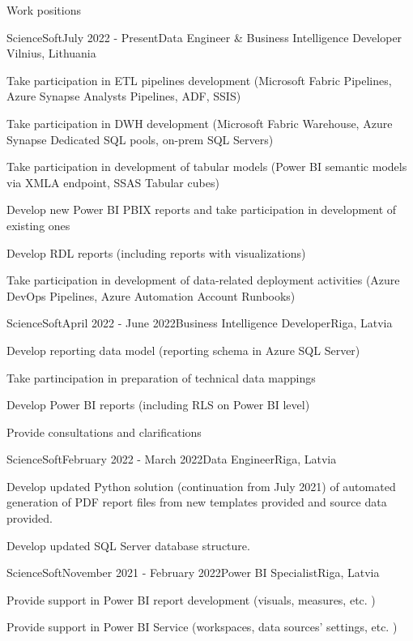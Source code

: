 \documentclass{resume} %
\begin{document}
\begin{rSection}{Work positions}

\begin{rSubsection}{ScienceSoft}{July 2022 - Present}{Data Engineer \& Business Intelligence Developer
}{Vilnius, Lithuania}
\item Take participation in ETL pipelines development (Microsoft Fabric Pipelines, Azure Synapse Analysts Pipelines, ADF, SSIS)
\item Take participation in DWH development (Microsoft Fabric Warehouse, Azure Synapse Dedicated SQL pools, on-prem SQL Servers)
\item Take participation in development of tabular models (Power BI semantic models via XMLA endpoint, SSAS Tabular cubes)
\item Develop new Power BI PBIX reports and take participation in development of existing ones
\item Develop RDL reports (including reports with visualizations)
\item Take participation in development of data-related deployment activities (Azure DevOps Pipelines, Azure Automation Account Runbooks)
\end{rSubsection}

\begin{rSubsection}{ScienceSoft}{April 2022 - June 2022}{Business Intelligence Developer}{Riga, Latvia}
\item Develop reporting data model (reporting schema in Azure SQL Server)
\item Take partincipation in preparation of technical data mappings
\item Develop Power BI reports (including RLS on Power BI level)
\item Provide consultations and clarifications
\end{rSubsection}

\begin{rSubsection}{ScienceSoft}{February 2022 - March 2022}{Data Engineer}{Riga, Latvia}
\item Develop updated Python solution (continuation from July 2021) of automated generation of PDF report files from new templates provided and source data provided.
\item Develop updated SQL Server database structure.
\end{rSubsection}

\begin{rSubsection}{ScienceSoft}{November 2021 - February 2022}{Power BI Specialist}{Riga, Latvia}
\item Provide support in Power BI report development (visuals, measures, etc. )
\item Provide support in Power BI Service (workspaces, data sources' settings, etc. )
\end{rSubsection}


\end{rSection}
\end{document}
